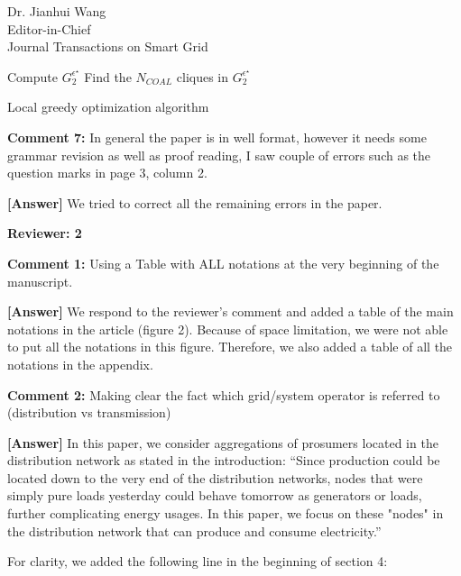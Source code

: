 \documentclass{letter}
\begin{document}
\begin{letter}{Dr. Jianhui Wang \\ Editor-in-Chief \\ Journal Transactions on Smart Grid }
\begin{algorithm}
 Compute $ G_{2}^{\epsilon^{\star}} $ \;
 Find the $ N_{COAL} $ cliques in $ G_{2}^{\epsilon^{\star}} $\;
 \caption{Local greedy optimization algorithm}
 \label{alg:algo1}
\end{algorithm}

\textbf{Comment 7:} In general the paper is in well format, however it needs some grammar revision as well as proof reading, I saw couple of errors such as the question marks in page 3, column 2.


\textbf{[Answer]} We tried to correct all the remaining errors in the paper.



\textbf{Reviewer: 2}

\textbf{Comment 1:} Using a Table with ALL notations at the very beginning of the manuscript.

\textbf{[Answer]} We respond to the reviewer’s comment and added a table of the main notations in the article (figure 2). Because of space limitation, we were not able to put all the notations in this figure. Therefore, we also added a table of all the notations in the appendix.


\textbf{Comment 2:} Making clear the fact which grid/system operator is referred to (distribution vs transmission)

\textbf{[Answer]} In this paper, we consider aggregations of prosumers located in the distribution network as stated in the introduction:
“Since production could be located down to the very end of the distribution networks, nodes that were simply pure loads yesterday could behave tomorrow as generators or loads, further complicating energy usages. In this paper, we focus on these "nodes" in the distribution network that can produce and consume electricity.”

For clarity, we added the following line in the beginning of section 4:


\end{letter}
\end{document}
